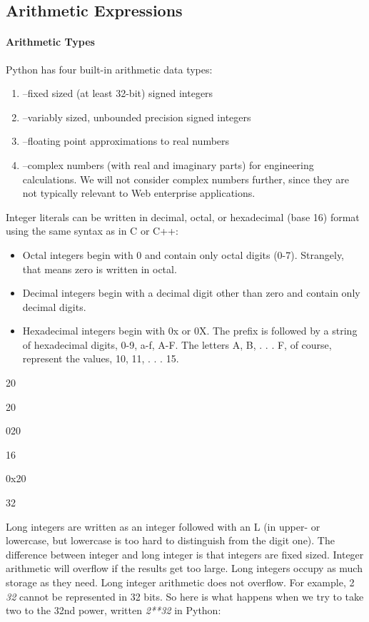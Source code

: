 \subsection{Arithmetic Expressions}

\paragraph{Arithmetic Types}

Python has four built-in arithmetic
data types:

\begin{enumerate}
\tightlist
\item
   --fixed sized (at
  least 32-bit) signed integers
\item
   --variably
  sized, unbounded precision signed integers
\item
   --floating point
  approximations to real numbers
\item
   --complex numbers
  (with real and imaginary parts) for engineering calculations. We will
  not consider complex numbers further, since they are not typically
  relevant to Web enterprise applications.
\end{enumerate}

Integer literals can be written in
decimal, octal, or hexadecimal (base 16) format using the same syntax as
in C or C++:

\begin{itemize}
\tightlist
\item
  Octal integers begin with 0 and
  contain only octal digits (0-7). Strangely, that means zero is written
  in octal.
\item
  Decimal integers begin with a
  decimal digit other than zero and contain only decimal digits.
\item
  Hexadecimal integers begin with
  0x or 0X. The prefix is followed by a string of hexadecimal digits,
  0-9, a-f, A-F. The letters A, B, . . . F, of course, represent the
  values, 10, 11, . . . 15.
\end{itemize}


20

20


020

16


0x20

32

Long integers are written as an
integer followed with an L (in upper- or lowercase, but lowercase is too
hard to distinguish from the digit one). The difference between integer
and long integer is that integers are fixed sized. Integer arithmetic
will overflow if the results get too large. Long integers occupy as much
storage as they need. Long integer arithmetic does not overflow. For
example, 2 \emph{32} cannot be represented in 32 bits. So here is what
happens when we try to take two to the 32nd power, written \emph{2**32}
in Python:


